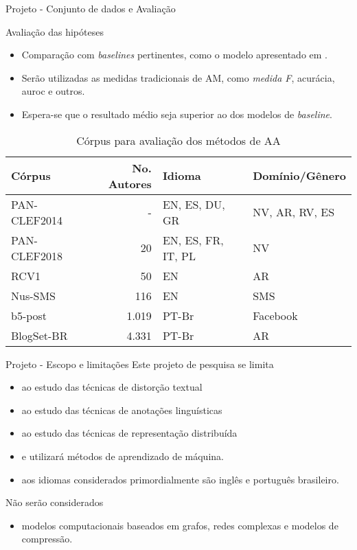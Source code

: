 \begin{frame}{Projeto - Conjunto de dados e Avaliação}

\begin{block}{Avaliação das hipóteses}
	\begin{itemize}
		\item Comparação com {\it baselines} pertinentes, como o modelo apresentado em .
		\item Serão utilizadas as medidas tradicionais de AM, como {\it medida F}, acurácia, auroc e outros.
		\item Espera-se que o resultado médio seja superior ao dos modelos de {\it baseline}.
	\end{itemize}
\end{block}

\setlength{\tabcolsep}{4pt}\selectFont
\begin{table}[!htbp]
	\centering
	\caption{Córpus para avaliação dos métodos de AA}
	\begin{tabular}{l|rll}
		\toprule
		Córpus       & No. Autores & Idioma             & Domínio/Gênero \\ \midrule
		PAN-CLEF2014 &           - & EN, ES, DU, GR     & NV, AR, RV, ES \\ \hline
		PAN-CLEF2018 &          20 & EN, ES, FR, IT, PL & NV             \\ \hline
		RCV1         &          50 & EN                 & AR             \\ \hline
		Nus-SMS      &         116 & EN                 & SMS            \\ \hline
		b5-post      &       1.019 & PT-Br              & Facebook       \\ \hline
		BlogSet-BR   &       4.331 & PT-Br              & AR             \\ \bottomrule
	\end{tabular}
	\label{tab.results}
\end{table}

\end{frame}

\begin{frame}{Projeto - Escopo e limitações}
	Este projeto de pesquisa se limita
	\begin{itemize}
		\item ao estudo das técnicas de distorção textual
		\item ao estudo das técnicas de anotações linguísticas
		\item ao estudo das técnicas de representação distribuída
		\item e utilizará métodos de aprendizado de máquina.
		\item aos idiomas considerados primordialmente são inglês e português brasileiro.
	\end{itemize}

	Não serão considerados
	\begin{itemize}
		\item  modelos computacionais baseados em grafos, redes complexas e modelos de compressão.
	\end{itemize}
\end{frame}


